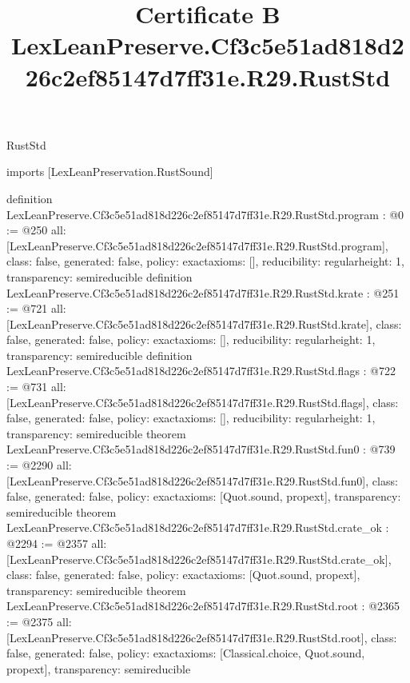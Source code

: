 \begin{lexlean}{RustStd}
\title{Certificate B LexLeanPreserve.Cf3c5e51ad818d226c2ef85147d7ff31e.R29.RustStd}
\begin{coremodule}
imports [LexLeanPreservation.RustSound]

definition LexLeanPreserve.Cf3c5e51ad818d226c2ef85147d7ff31e.R29.RustStd.program : @0 := @250 {
  all: [LexLeanPreserve.Cf3c5e51ad818d226c2ef85147d7ff31e.R29.RustStd.program],
  class: false,
  generated: false,
  policy: exact{axioms: []},
  reducibility: regular{height: 1},
  transparency: semireducible
}
definition LexLeanPreserve.Cf3c5e51ad818d226c2ef85147d7ff31e.R29.RustStd.krate : @251 := @721 {
  all: [LexLeanPreserve.Cf3c5e51ad818d226c2ef85147d7ff31e.R29.RustStd.krate],
  class: false,
  generated: false,
  policy: exact{axioms: []},
  reducibility: regular{height: 1},
  transparency: semireducible
}
definition LexLeanPreserve.Cf3c5e51ad818d226c2ef85147d7ff31e.R29.RustStd.flags : @722 := @731 {
  all: [LexLeanPreserve.Cf3c5e51ad818d226c2ef85147d7ff31e.R29.RustStd.flags],
  class: false,
  generated: false,
  policy: exact{axioms: []},
  reducibility: regular{height: 1},
  transparency: semireducible
}
theorem LexLeanPreserve.Cf3c5e51ad818d226c2ef85147d7ff31e.R29.RustStd.fun0 : @739 := @2290 {
  all: [LexLeanPreserve.Cf3c5e51ad818d226c2ef85147d7ff31e.R29.RustStd.fun0],
  class: false,
  generated: false,
  policy: exact{axioms: [Quot.sound, propext]},
  transparency: semireducible
}
theorem LexLeanPreserve.Cf3c5e51ad818d226c2ef85147d7ff31e.R29.RustStd.crate_ok : @2294 := @2357 {
  all: [LexLeanPreserve.Cf3c5e51ad818d226c2ef85147d7ff31e.R29.RustStd.crate_ok],
  class: false,
  generated: false,
  policy: exact{axioms: [Quot.sound, propext]},
  transparency: semireducible
}
theorem LexLeanPreserve.Cf3c5e51ad818d226c2ef85147d7ff31e.R29.RustStd.root : @2365 := @2375 {
  all: [LexLeanPreserve.Cf3c5e51ad818d226c2ef85147d7ff31e.R29.RustStd.root],
  class: false,
  generated: false,
  policy: exact{axioms: [Classical.choice, Quot.sound, propext]},
  transparency: semireducible
}


\end{coremodule}
\end{lexlean}
